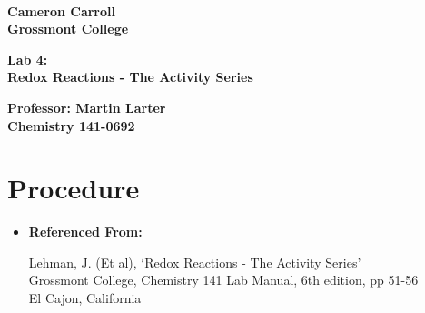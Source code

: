 \documentclass[fleqn,titlepage]{article}
\begin{document}
\begin{titlepage}
  \mbox{}\\[1.25cm]
  \textbf{\LARGE Cameron Carroll \\ Grossmont College}\\[2.25cm]
  \begin{center}
    \textbf{\huge Lab 4: \\ Redox Reactions - The Activity Series}\\[2.50cm]
  \end{center}
  \textbf{\LARGE Professor: Martin Larter \\ Chemistry 141-0692} \\
  \vfill
\end{titlepage}

\section*{Procedure}
\begin{itemize}
  \item  \textbf{Referenced From:} \\
    \begin{addmargin}[1em]{1em}
      Lehman, J. (Et al), `Redox Reactions - The Activity Series' \\
      Grossmont College, Chemistry 141 Lab Manual, 6th edition, pp 51-56 \\
      El Cajon, California
    \end{addmargin}
\end{itemize}
\end{document}
